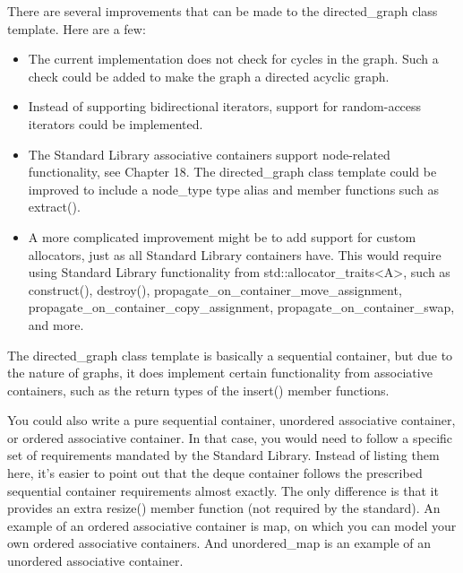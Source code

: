 
There are several improvements that can be made to the directed\_graph class template. Here are a few:

\begin{itemize}
\item
The current implementation does not check for cycles in the graph. Such a check could be added to make the graph a directed acyclic graph.

\item
Instead of supporting bidirectional iterators, support for random-access iterators could be implemented.

\item
The Standard Library associative containers support node-related functionality, see Chapter 18. The directed\_graph class template could be improved to include a node\_type type alias and member functions such as extract().

\item
A more complicated improvement might be to add support for custom allocators, just as all Standard Library containers have. This would require using Standard Library functionality from std::allocator\_traits<A>, such as construct(), destroy(), propagate\_on\_container\_move\_assignment, propagate\_on\_container\_copy\_assignment, propagate\_on\_container\_swap, and more.
\end{itemize}


The directed\_graph class template is basically a sequential container, but due to the nature of graphs, it does implement certain functionality from associative containers, such as the return types of the insert() member functions.

You could also write a pure sequential container, unordered associative container, or ordered associative container. In that case, you would need to follow a specific set of requirements mandated by the Standard Library. Instead of listing them here, it’s easier to point out that the deque container follows the prescribed sequential container requirements almost exactly. The only difference is that it provides an extra resize() member function (not required by the standard). An example of an ordered associative container is map, on which you can model your own ordered associative containers. And unordered\_map is an example of an unordered associative container.


